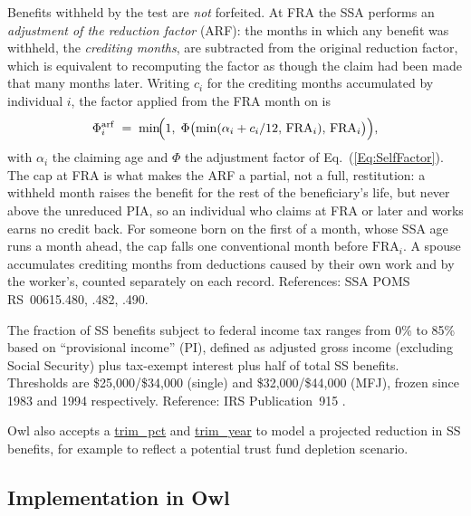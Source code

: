 \documentclass[fleqn,12pt]{report}
\newcommand{\code}[1]{\url{#1}}
\begin{document}
Benefits withheld by the test are \emph{not} forfeited.
At FRA the SSA performs an \emph{adjustment of the reduction factor} (ARF):
the months in which any benefit was withheld, the \emph{crediting months}, are
subtracted from the original reduction factor, which is equivalent to
recomputing the factor as though the claim had been made that many months
later.
Writing $c_i$ for the crediting months accumulated by individual $i$, the
factor applied from the FRA month on is
\begin{equation}
    \label{Eq:ARF}
    \Phi^{\mathrm{arf}}_i \;=\;
    \min\!\Bigl(1,\; \Phi\bigl(\min(\alpha_i + c_i/12,\, \mathrm{FRA}_i),\,
        \mathrm{FRA}_i\bigr)\Bigr),
\end{equation}
with $\alpha_i$ the claiming age and $\Phi$ the adjustment factor of
Eq.~(\ref{Eq:SelfFactor}).
The cap at FRA is what makes the ARF a partial, not a full, restitution: a
withheld month raises the benefit for the rest of the beneficiary's life, but
never above the unreduced PIA, so an individual who claims at FRA or later and
works earns no credit back.
For someone born on the first of a month, whose SSA age runs a month ahead, the
cap falls one conventional month before $\mathrm{FRA}_i$.
A spouse accumulates crediting months from deductions caused by their own work
and by the worker's, counted separately on each record.
References: SSA POMS RS~00615.480, .482, .490.

The fraction of SS benefits subject to federal income tax ranges from 0\% to
85\% based on ``provisional income'' (PI), defined as adjusted gross income
(excluding Social Security) plus tax-exempt interest plus half of total SS benefits.
Thresholds are \$25,000/\$34,000 (single) and \$32,000/\$44,000 (MFJ), frozen
since 1983 and 1994 respectively.
Reference: IRS Publication~915 \cite{irs915}.

Owl also accepts a \code{trim_pct} and \code{trim_year} to model a
projected reduction in SS benefits, for example to reflect a potential trust
fund depletion scenario.

\subsection*{Implementation in Owl}
\end{document}

